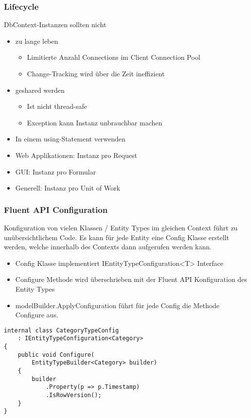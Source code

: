 \begin{multicols*}{2}
\subsubsection{Lifecycle}
DbContext-Instanzen sollten nicht
\begin{itemize}
    \item zu lange leben
        \begin{itemize}
            \item Limitierte Anzahl Connections im Client Connection Pool
            \item Change-Tracking wird über die Zeit ineffizient
        \end{itemize}
    \item geshared werden
        \begin{itemize}
            \item Ist nicht thread-safe
            \item Exception kann Instanz unbrauchbar machen
        \end{itemize}
\end{itemize}
\begin{itemize}
    \item In einem using-Statement verwenden
    \item Web Applikationen: Instanz pro Request
    \item GUI: Instanz pro Formular
    \item Generell: Instanz pro Unit of Work
\end{itemize}

\subsubsection{Fluent API Configuration}
Konfiguration von vielen Klassen / Entity Types im gleichen Context führt zu unübersichtlichem Code.
Es kann für jede Entity eine Config Klasse erstellt werden, welche innerhalb des Contexts dann aufgerufen werden kann.
\begin{itemize}
    \item Config Klasse implementiert IEntityTypeConfiguration<T> Interface
    \item Configure Methode wird überschrieben mit der Fluent API Konfiguration des Entity Types
    \item modelBuilder.ApplyConfiguration führt für jede Config die Methode Configure aus.
\end{itemize}
\begin{lstlisting}
internal class CategoryTypeConfig
    : IEntityTypeConfiguration<Category>
{
    public void Configure(
        EntityTypeBuilder<Category> builder)
    {
        builder
            .Property(p => p.Timestamp) 
            .IsRowVersion();
    } 
}


\end{lstlisting}
\end{multicols*}

